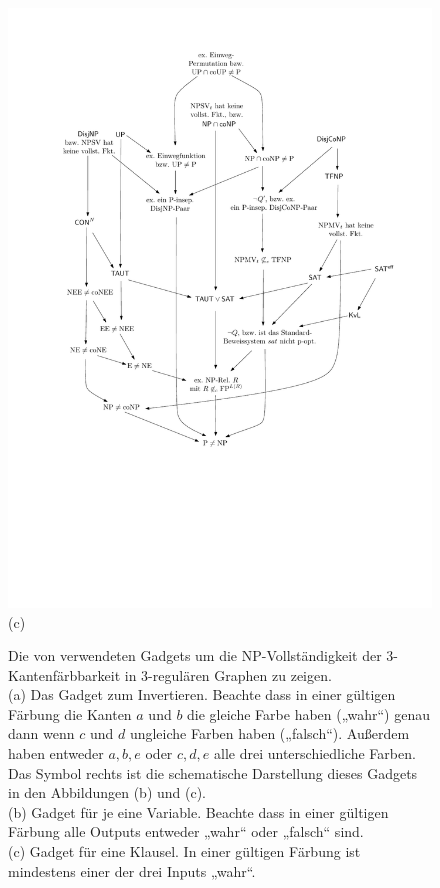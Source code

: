 \begin{figure}
\begin{minipage}{.3\textwidth}
    \centering\includegraphics[page=5]{figures.pdf}\\\smallskip
    (c)
    \end{minipage}
    \caption{Die von \textcite{holyer_np-completeness_1981} verwendeten Gadgets um die NP-Vollständigkeit der 3-Kantenfärbbarkeit in 3-regulären Graphen zu zeigen.\\
        (a) Das Gadget zum Invertieren. Beachte dass in einer gültigen Färbung die Kanten $a$ und $b$ die gleiche Farbe haben („wahr“) genau dann wenn $c$ und $d$ ungleiche Farben haben („falsch“). Außerdem haben entweder $a,b,e$ oder $c,d,e$ alle drei unterschiedliche Farben. Das Symbol rechts ist die schematische Darstellung dieses Gadgets in den Abbildungen (b) und (c).\\
        (b) Gadget für je eine Variable. Beachte dass in einer gültigen Färbung alle Outputs entweder „wahr“ oder „falsch“ sind.\\
        (c) Gadget für eine Klausel. In einer gültigen Färbung ist mindestens einer der drei Inputs „wahr“.
    }\label{fig:chromindex}
\end{figure}

